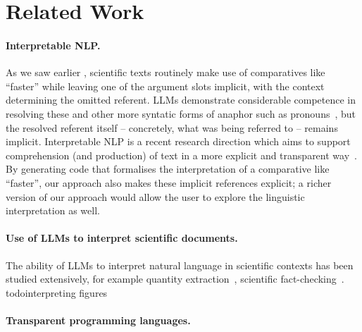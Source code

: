 \section{Related Work}
\label{sec:related}

\paragraph{Interpretable NLP.}

As we saw earlier , scientific texts routinely make use of comparatives like ``faster'' while
leaving one of the argument slots implicit, with the context determining the omitted referent. LLMs
demonstrate considerable competence in resolving these and other more syntatic forms of anaphor such as
pronouns~\citep{zhu25}, but the resolved referent itself -- concretely, what was being referred to -- remains
implicit. Interpretable NLP is a recent research direction which aims to support comprehension (and
production) of text in a more explicit and transparent way~\citep{yulan23}. By generating code that formalises
the interpretation of a comparative like ``faster'', our approach also makes these implicit references
explicit; a richer version of our approach would allow the user to explore the linguistic interpretation as
well. 

\paragraph{Use of LLMs to interpret scientific documents.}

The ability of LLMs to interpret natural language in scientific contexts has been studied extensively, for
example quantity extraction~\citep{bolucu23}, scientific fact-checking~\citep{abu-ahmad25}. todo{interpreting
figures}

\paragraph{Transparent programming languages.}

\cite{perera22,bond25,psallidas18smoke}
